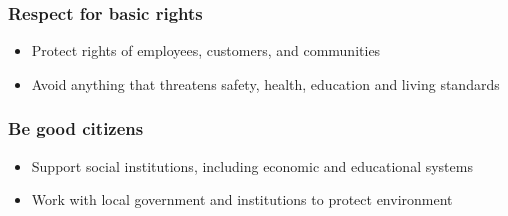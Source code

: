 \documentclass[11pt]{article}
\begin{document}
\subsubsection*{Respect for basic rights}
\label{sec:orgc124903}
\begin{itemize}
\item Protect rights of employees, customers, and communities
\item Avoid anything that threatens safety, health, education and living standards
\end{itemize}

\subsubsection*{Be good citizens}
\label{sec:orgf919a48}
\begin{itemize}
\item Support social institutions, including economic and educational systems
\item Work with local government and institutions to protect environment
\end{itemize}
\end{document}
